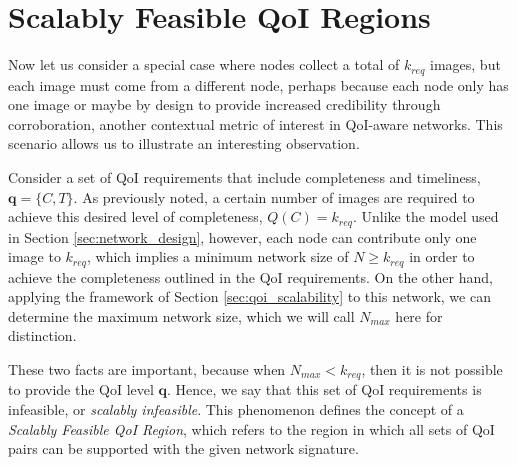 \section{Scalably Feasible QoI Regions}
\label{sec:scal_feasible_qoi}

Now let us consider a special case where nodes collect a total of $k_{req}$ images, but each image must come from a different node, perhaps because each node only has one image or maybe by design to provide increased credibility through corroboration, another contextual metric of interest in QoI-aware networks. This scenario allows us to illustrate an interesting observation.  

Consider a set of QoI requirements that include completeness and timeliness, $\mathbf{q} = \{C,T\}$.  As previously noted, a certain number of images are required to achieve this desired level of completeness, $Q(C) = k_{req}$.  Unlike the model used in Section \ref{sec:network_design}, however, each node can contribute only one image to $k_{req}$, which implies a minimum network size of $N \geq k_{req}$ in order to achieve the completeness outlined in the QoI requirements.  On the other hand, applying the framework of Section \ref{sec:qoi_scalability} to this network, we can determine the maximum network size, which we will call $N_{max}$ here for distinction.  

These two facts are important, because when $N_{max} < k_{req}$, then it is not possible to provide the QoI level $\mathbf{q}$.  Hence, we say that this set of QoI requirements is infeasible, or \emph{scalably infeasible}.  This phenomenon defines the concept of a \emph{Scalably Feasible QoI Region}, which refers to the region in which all sets of QoI pairs can be supported with the given network signature.  

